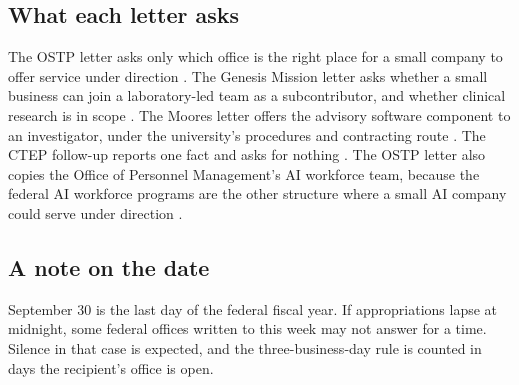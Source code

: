 \subsection{What each letter asks}

The OSTP letter asks only which office is the right place for a small company to
offer service under direction \cite{ostp2026,ostpinfo2026}. The Genesis Mission
letter asks whether a small business can join a laboratory-led team as a
subcontributor, and whether clinical research is in scope
\cite{doegenesis2026,doegenesisfoa2026}. The Moores letter offers the advisory
software component to an investigator, under the university's procedures and
contracting route \cite{ucsdmoorescto2026,ucsdactri2026,ucsdocta2026}. The CTEP
follow-up reports one fact and asks for nothing \cite{ctep2026}. The OSTP letter
also copies the Office of Personnel Management's AI workforce team, because the
federal AI workforce programs are the other structure where a small AI company
could serve under direction \cite{opmaiworkforce2026,opmtechforce2026}.

\subsection{A note on the date}

September 30 is the last day of the federal fiscal year. If appropriations lapse
at midnight, some federal offices written to this week may not answer for a
time. Silence in that case is expected, and the three-business-day rule is
counted in days the recipient's office is open.

